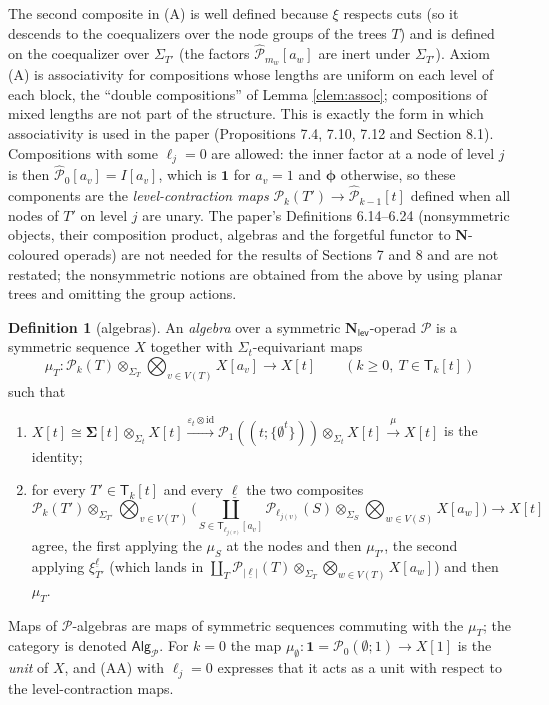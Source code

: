 \documentclass[12pt]{article}
\theoremstyle{plain}
\theoremstyle{definition}
\newtheorem{cdefinition}[ctheorem]{Definition}
\theoremstyle{remark}
\newcommand{\Cal}[1]{\mathcal{#1}}
\newcommand{\Nl}{\mathbf{N}_{\mathsf{lev}}}
\newcommand{\id}{\mathrm{id}}
\newcommand{\ptC}{\boldsymbol{\phi}}
\newcommand{\Tr}{\mathsf{T}}
\begin{document}
The second composite in (A) is well defined because $\xi$ respects cuts (so it descends to the coequalizers over the node groups of the trees $T$) and is defined on the coequalizer over $\Sigma_{T'}$ (the factors $\widehat{\Cal P}_{m_w}[a_w]$ are inert under $\Sigma_{T'}$). Axiom (A) is associativity for compositions whose lengths are uniform on each level of each block, the ``double compositions'' of Lemma \ref{clem:assoc}; compositions of mixed lengths are not part of the structure. This is exactly the form in which associativity is used in the paper (Propositions 7.4, 7.10, 7.12 and Section 8.1). Compositions with some $\ell_j=0$ are allowed: the inner factor at a node of level $j$ is then $\widehat{\Cal P}_0[a_v]=I[a_v]$, which is $\mathbf1$ for $a_v=1$ and $\ptC$ otherwise, so these components are the \emph{level-contraction maps} $\Cal P_k(T')\to\widehat{\Cal P}_{k-1}[t]$ defined when all nodes of $T'$ on level $j$ are unary. The paper's Definitions 6.14--6.24 (nonsymmetric objects, their composition product, algebras and the forgetful functor to $\mathbf N$-coloured operads) are not needed for the results of Sections 7 and 8 and are not restated; the nonsymmetric notions are obtained from the above by using planar trees and omitting the group actions.

\begin{cdefinition}[algebras]\label{cdef:algebra}
An \emph{algebra} over a symmetric $\Nl$-operad $\Cal P$ is a symmetric sequence $X$ together with $\Sigma_t$-equivariant maps
\[\mu_T\colon\Cal P_k(T)\otimes_{\Sigma_T}\bigotimes_{v\in V(T)}X[a_v]\longrightarrow X[t]\qquad(k\geq0,\ T\in\Tr_k[t])\]
such that
\begin{enumerate}[leftmargin=2em]
\item[(AU)] $X[t]\cong\mathbf\Sigma[t]\otimes_{\Sigma_t}X[t]\xrightarrow{\varepsilon_t\otimes\id}\Cal P_1((t;\{\emptyset^t\}))\otimes_{\Sigma_t}X[t]\xrightarrow{\mu}X[t]$ is the identity;
\item[(AA)] for every $T'\in\Tr_k[t]$ and every $\underline\ell$ the two composites
\[\Cal P_k(T')\otimes_{\Sigma_{T'}}\bigotimes_{v\in V(T')}\Big(\coprod_{S\in\Tr_{\ell_{j(v)}}[a_v]}\Cal P_{\ell_{j(v)}}(S)\otimes_{\Sigma_S}\bigotimes_{w\in V(S)}X[a_w]\Big)\longrightarrow X[t]\]
agree, the first applying the $\mu_S$ at the nodes and then $\mu_{T'}$, the second applying $\xi^{\underline\ell}_{T'}$ (which lands in $\coprod_T\Cal P_{|\underline\ell|}(T)\otimes_{\Sigma_T}\bigotimes_{w\in V(T)}X[a_w]$) and then $\mu_T$.
\end{enumerate}
Maps of $\Cal P$-algebras are maps of symmetric sequences commuting with the $\mu_T$; the category is denoted $\mathsf{Alg}_{\Cal P}$. For $k=0$ the map $\mu_\emptyset\colon\mathbf1=\Cal P_0(\emptyset;1)\to X[1]$ is the \emph{unit} of $X$, and (AA) with $\ell_j=0$ expresses that it acts as a unit with respect to the level-contraction maps.
\end{cdefinition}
\end{document}
